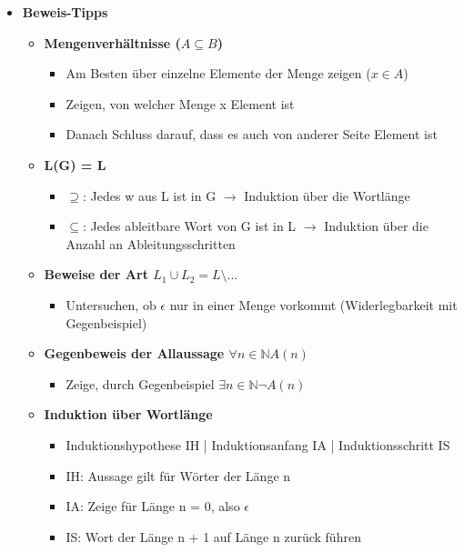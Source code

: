 \begin{itemize}
\begin{itemize}
	\end{itemize}
	
	
\item {\large \textbf{Beweis-Tipps}}
	\begin{itemize}
	
	\item \textbf{Mengenverhältnisse ($A \subseteq B$)}
		\begin{itemize}
		\item Am Besten über einzelne Elemente der Menge zeigen ($x \in A$)
		\item Zeigen, von welcher Menge x Element ist
		\item Danach Schluss darauf, dass es auch von anderer Seite Element ist
		\end{itemize}		
		
	
	\item \textbf{L(G) = L}
		\begin{itemize}
		\item $\supseteq$: Jedes w aus L ist in G $\rightarrow$ Induktion über die Wortlänge
		\item $\subseteq$: Jedes ableitbare Wort von G ist in L $\rightarrow$ Induktion über die Anzahl an Ableitungsschritten
		\end{itemize}
	
	\item \textbf{Beweise der Art $L_1 \cup L_2 = L \setminus ...$}
		\begin{itemize}
		\item Untersuchen, ob $\epsilon$ nur in einer Menge vorkommt (Widerlegbarkeit mit Gegenbeispiel)
		\end{itemize}
		
	\item \textbf{Gegenbeweis der Allaussage $\forall n \in \mathbb{N} A(n)$}
		\begin{itemize}
		\item Zeige, durch Gegenbeispiel $\exists n \in \mathbb{N} \lnot A(n)$
		\end{itemize}
		
	\item \textbf{Induktion über Wortlänge}
		\begin{itemize}
		\item Induktionshypothese IH | Induktionsanfang IA | Induktionsschritt IS
		\item IH: Aussage gilt für Wörter der Länge n
		\item IA: Zeige für Länge n = 0, also $\epsilon$
		\item IS: Wort der Länge n + 1 auf Länge n zurück führen
		\end{itemize}		
	

\end{itemize}
\end{itemize}

